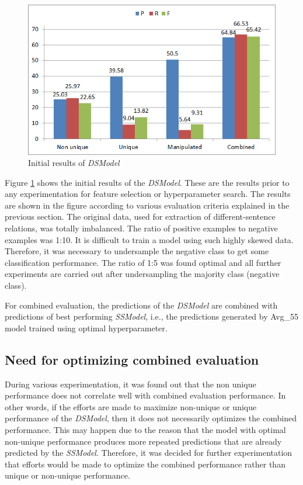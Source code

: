 \begin{figure}
\centering
\includegraphics[scale=0.7]{figures/DSInitialResults.png}
\caption{Initial results of \textit{DSModel}}\label{fig:DSInitial}
\end{figure}

Figure \ref{fig:DSInitial} shows the initial results of the \textit{DSModel}. These are the results prior to any experimentation for feature selection or hyperparameter search. The results are shown in the figure according to various evaluation criteria explained in the previous section. The original data, used for extraction of different-sentence relations, was totally imbalanced. The ratio of positive examples to negative examples was 1:10. It is difficult to train a model using such highly skewed data. Therefore, it was necessary to undersample \cite{akbani2004applying} the negative class to get some classification performance. The ratio of 1:5 was found optimal and all further experiments are carried out after undersampling the majority class (negative class).

For combined evaluation, the predictions of the \textit{DSModel} are combined with predictions of best performing \textit{SSModel}, i.e., the predictions generated by Avg\_55 model trained using optimal hyperparameter.

\subsection{Need for optimizing combined evaluation}

During various experimentation, it was found out that the non unique performance does not correlate well with combined evaluation performance. In other words, if the efforts are made to maximize non-unique or unique performance of the \textit{DSModel}, then it does not necessarily optimizes the combined performance.  This may happen due to the reason that the model with optimal non-unique performance produces more repeated predictions that are already predicted by the \textit{SSModel}. Therefore, it was decided for further experimentation that efforts would be made to optimize the combined performance rather than unique or non-unique performance.

